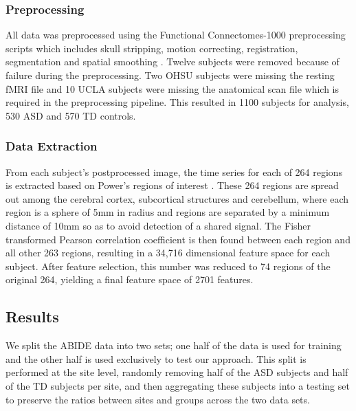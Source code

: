 \documentclass{llncs}
\begin{document}
\subsubsection{Preprocessing}
All data was preprocessed using the Functional Connectomes-1000 preprocessing scripts which includes skull stripping, motion correcting, registration, segmentation and spatial smoothing \cite{fcon}.
Twelve subjects were removed because of failure during the preprocessing.  Two OHSU subjects were missing the resting fMRI file and 10 UCLA subjects were missing the anatomical scan file which is required in the preprocessing pipeline. This resulted in 1100 subjects for analysis, 530 ASD and 570 TD controls.
\subsubsection{Data Extraction}
From each subject's postprocessed image, the time series for each of 264 regions is extracted based on Power's regions of interest \cite{Powers}. These 264 regions are spread out among the cerebral cortex, subcortical structures and cerebellum, where each region is a sphere of 5mm in radius and regions are separated by a minimum distance of 10mm so as to avoid detection of a shared signal. The Fisher transformed Pearson correlation coefficient is then found between each region and all other 263 regions, resulting in a 34,716 dimensional feature space for each subject. After feature selection, this number was reduced to 74 regions of the original 264, yielding a final feature space of 2701 features.
\subsection{Results}
We split the ABIDE data into two sets; one half of the data is used for training and the other half is used exclusively to test our approach.  This split is performed at the site level, randomly removing half of the ASD subjects and half of the TD subjects per site, and then aggregating these subjects into a testing set to preserve the ratios between sites and groups across the two data sets.
\end{document}
